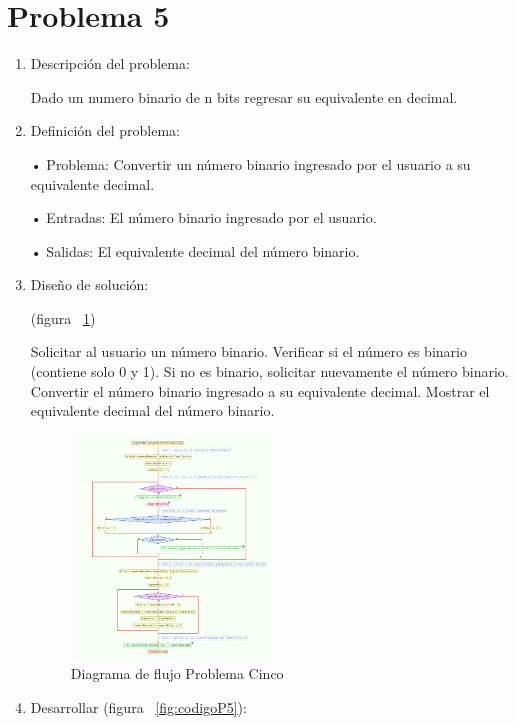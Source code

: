 \documentclass{IEEEcsmag}
\begin{document}
\section{Problema 5}
\setlength{\parskip}{5pt}
\begin{enumerate}
\setlength{\parskip}{5pt}
\item Descripción del problema:

Dado un numero binario de n bits regresar su equivalente en decimal.


\item Definición del problema:

• Problema: Convertir un número binario ingresado por el usuario a su equivalente decimal. 

• Entradas: El número binario ingresado por el usuario. 

• Salidas: El equivalente decimal del número binario.

\item Diseño de solución:

(figura ~\ref{fig:diagramaP5})

Solicitar al usuario un número binario.
Verificar si el número es binario (contiene solo 0 y 1).
Si no es binario, solicitar nuevamente el número binario.
Convertir el número binario ingresado a su equivalente decimal.
Mostrar el equivalente decimal del número binario.

\begin{figure}
\caption{Diagrama de flujo Problema Cinco}
\centerline{\includegraphics[width=0.5\textwidth]{./latex-imagenes/diagramaprob5.png}}
\vspace*{7pt}
\label{fig:diagramaP5}
\end{figure}

\setlength{\parskip}{5pt}   

\item Desarrollar (figura ~\ref{fig:codigoP5}):


\end{enumerate}
\end{document}
